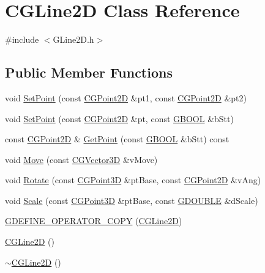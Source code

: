 \hypertarget{class_c_g_line2_d}{}\section{C\+G\+Line2\+D Class Reference}
\label{class_c_g_line2_d}


{\ttfamily \#include $<$G\+Line2\+D.\+h$>$}

\subsection*{Public Member Functions}
\begin{DoxyCompactItemize}
\item 
void \hyperlink{class_c_g_line2_d_ac2a5d9a9028eabe481dc9af809616889}{Set\+Point} (const \hyperlink{class_c_g_point2_d}{C\+G\+Point2\+D} \&pt1, const \hyperlink{class_c_g_point2_d}{C\+G\+Point2\+D} \&pt2)
\item 
void \hyperlink{class_c_g_line2_d_ab1ec93b0a05aa8f75b2f0ff10da228eb}{Set\+Point} (const \hyperlink{class_c_g_point2_d}{C\+G\+Point2\+D} \&pt, const \hyperlink{_g_types_8h_a2901915743626352a6820c5405f556dc}{G\+B\+O\+O\+L} \&b\+Stt)
\item 
const \hyperlink{class_c_g_point2_d}{C\+G\+Point2\+D} \& \hyperlink{class_c_g_line2_d_aa249d20c454c8afb3e3037e867237984}{Get\+Point} (const \hyperlink{_g_types_8h_a2901915743626352a6820c5405f556dc}{G\+B\+O\+O\+L} \&b\+Stt) const 
\item 
void \hyperlink{class_c_g_line2_d_a3bfef1d08c1d7eb832ca89c099caed35}{Move} (const \hyperlink{_g_point3_d_8h_aa7e73d39f4c991acb5a13c84b498366d}{C\+G\+Vector3\+D} \&v\+Move)
\item 
void \hyperlink{class_c_g_line2_d_a5829fa4454f0c92a1af92ad4bed57c14}{Rotate} (const \hyperlink{class_c_g_point3_d}{C\+G\+Point3\+D} \&pt\+Base, const \hyperlink{class_c_g_point2_d}{C\+G\+Point2\+D} \&v\+Ang)
\item 
void \hyperlink{class_c_g_line2_d_a54aad03b32f4eb25576c2f8f028bd461}{Scale} (const \hyperlink{class_c_g_point3_d}{C\+G\+Point3\+D} \&pt\+Base, const \hyperlink{_g_types_8h_afd05ac85f90ee8e2a733928545462cd4}{G\+D\+O\+U\+B\+L\+E} \&d\+Scale)
\item 
\hyperlink{class_c_g_line2_d_ac9e0b479131e735c938d0711d04ab5f5}{G\+D\+E\+F\+I\+N\+E\+\_\+\+O\+P\+E\+R\+A\+T\+O\+R\+\_\+\+C\+O\+P\+Y} (\hyperlink{class_c_g_line2_d}{C\+G\+Line2\+D})
\item 
\hyperlink{class_c_g_line2_d_a82c28012a8ad0756dba8f65248695a07}{C\+G\+Line2\+D} ()
\item 
\hyperlink{class_c_g_line2_d_aa889c5c71a4517f999d9a0e2e27a43f1}{$\sim$\+C\+G\+Line2\+D} ()
\end{DoxyCompactItemize}


